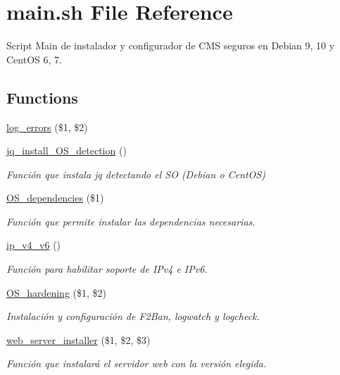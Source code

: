 \hypertarget{main_8sh}{}\section{main.\+sh File Reference}
\label{main_8sh}


Script Main de instalador y configurador de C\+MS seguros en Debian 9, 10 y Cent\+OS 6, 7.  


\subsection*{Functions}
\begin{DoxyCompactItemize}
\item 
\hyperlink{main_8sh_a92067b58a8478c9841b2cd9b75ea3565}{log\+\_\+errors} (\$1, \$2)
\item 
\mbox{\label{main_8sh_a14153ec632198b7643c2d2f1cff3471d}} 
\hyperlink{main_8sh_a14153ec632198b7643c2d2f1cff3471d}{jq\+\_\+install\+\_\+\+O\+S\+\_\+detection} ()
\begin{DoxyCompactList}\small\item\em Función que instala jq detectando el SO (Debian o Cent\+OS) \end{DoxyCompactList}\item 
\hyperlink{main_8sh_a48e8d18ccca665f9cd6bacd76dcd3d7d}{O\+S\+\_\+dependencies} (\$1)
\begin{DoxyCompactList}\small\item\em Función que permite instalar las dependencias necesarias. \end{DoxyCompactList}\item 
\hyperlink{main_8sh_a7257eec52c0bd74e8cf1d671c0cba810}{ip\+\_\+v4\+\_\+v6} ()
\begin{DoxyCompactList}\small\item\em Función para habilitar soporte de I\+Pv4 e I\+Pv6. \end{DoxyCompactList}\item 
\hyperlink{main_8sh_acd33682741fa52b482fbeb09846bd3cb}{O\+S\+\_\+hardening} (\$1, \$2)
\begin{DoxyCompactList}\small\item\em Instalación y configuración de F2\+Ban, logwatch y logcheck. \end{DoxyCompactList}\item 
\hyperlink{main_8sh_a8fbc4bde96d235c9985b0d1697e1b552}{web\+\_\+server\+\_\+installer} (\$1, \$2, \$3)
\begin{DoxyCompactList}\small\item\em Función que instalará el servidor web con la versión elegida. \end{DoxyCompactList}\item 

\end{DoxyCompactItemize}
